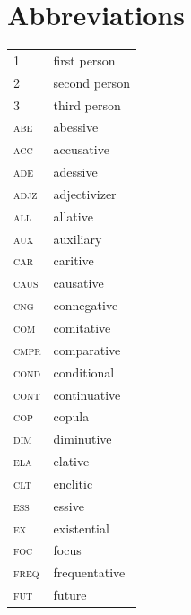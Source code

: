\documentclass[output=paper,colorlinks=true, citecolor=brown]{langscibook}
\begin{document}
\section*{Abbreviations}

\begin{tabularx}{.45\textwidth}{lQ}
1 & first person \\
2 & second person \\
3 & third person \\
{\scshape abe} & abessive\\
{\scshape acc} & accusative\\
{\scshape ade} & adessive\\
{\scshape adjz} & adjectivizer\\
{\scshape all} & allative\\
{\scshape aux} & auxiliary\\
{\scshape car} & caritive\\
{\scshape caus} & causative\\
{\scshape cng} & connegative\\
{\scshape com} & comitative\\
{\scshape cmpr} & comparative\\
{\scshape cond} & conditional\\
{\scshape cont} & continuative\\
{\scshape cop} & copula\\
{\scshape dim} & diminutive\\
{\scshape ela} & elative\\
{\scshape clt} & enclitic\\
{\scshape ess} & essive\\
{\scshape ex} & existential\\
{\scshape foc} & focus\\
{\scshape freq} & frequentative\\
{\scshape fut} & future\\
\end{tabularx}
\end{document}
